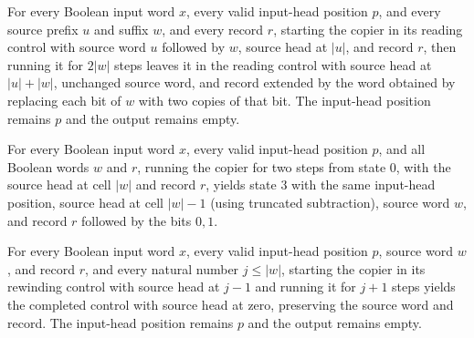 \begin{lemma}
\label{Complexity.clCopy_forward}
\leanok
{}
For every Boolean input word $x$, every valid input-head position $p$, and every source
prefix $u$ and suffix $w$, and every record $r$, starting the copier in its reading
control with source word $u$ followed by $w$, source head at $|u|$, and record $r$, then
running it for $2|w|$ steps leaves it in the reading control with source head at
$|u|+|w|$, unchanged source word, and record extended by the word obtained by replacing
each bit of $w$ with two copies of that bit. The input-head position remains $p$ and the
output remains empty.
\end{lemma}

\begin{lemma}
\label{Complexity.clCopy_separator}
\leanok
{}
For every Boolean input word $x$, every valid input-head position $p$, and all Boolean
words $w$ and $r$, running the copier for two steps from state $0$, with the source head
at cell $|w|$ and record $r$, yields state $3$ with the same input-head position, source
head at cell $|w|-1$ (using truncated subtraction), source word $w$, and record $r$
followed by the bits $0,1$.
\end{lemma}

\begin{lemma}
\label{Complexity.clCopy_rewind}
\leanok
{}
For every Boolean input word $x$, every valid input-head position $p$, source word $w$,
and record $r$, and every natural number $j\le |w|$, starting the copier in its
rewinding control with source head at $j-1$ and running it for $j+1$ steps yields the
completed control with source head at zero, preserving the source word and record. The
input-head position remains $p$ and the output remains empty.
\end{lemma}

